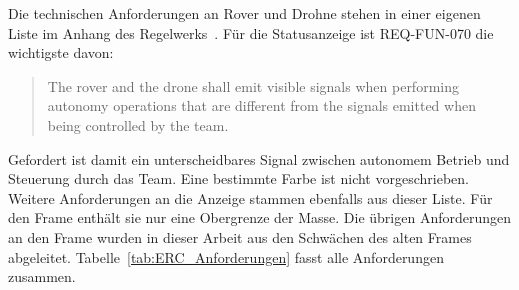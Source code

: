 Die technischen Anforderungen an Rover und Drohne stehen in einer eigenen Liste im Anhang des Regelwerks~\cite{ercRules2026, ercRequirements2026}. Für die Statusanzeige ist REQ-FUN-070 die wichtigste davon:

\begin{quote}
    \glqq The rover and the drone shall emit visible signals when performing autonomy operations that are different
    from the signals emitted when being controlled by the team.\grqq{}~\cite{ercRequirements2026}
\end{quote}

Gefordert ist damit ein unterscheidbares Signal zwischen autonomem Betrieb und Steuerung durch das Team. Eine bestimmte Farbe ist nicht vorgeschrieben. Weitere Anforderungen an die Anzeige stammen ebenfalls aus dieser Liste. Für den Frame enthält sie nur eine Obergrenze der Masse. Die übrigen Anforderungen an den Frame wurden in dieser Arbeit aus den Schwächen des alten Frames abgeleitet. Tabelle~\ref{tab:ERC_Anforderungen} fasst alle Anforderungen zusammen.

